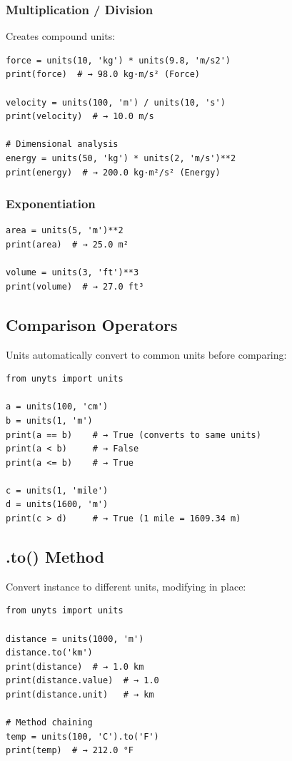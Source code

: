 \documentclass[11pt,a4paper]{report}
\begin{document}
\subsubsection{Multiplication / Division}

Creates compound units:

\begin{lstlisting}[style=pythonstyle]
force = units(10, 'kg') * units(9.8, 'm/s2')
print(force)  # → 98.0 kg·m/s² (Force)

velocity = units(100, 'm') / units(10, 's')
print(velocity)  # → 10.0 m/s

# Dimensional analysis
energy = units(50, 'kg') * units(2, 'm/s')**2
print(energy)  # → 200.0 kg·m²/s² (Energy)
\end{lstlisting}

\subsubsection{Exponentiation}

\begin{lstlisting}[style=pythonstyle]
area = units(5, 'm')**2
print(area)  # → 25.0 m²

volume = units(3, 'ft')**3
print(volume)  # → 27.0 ft³
\end{lstlisting}

\subsection{Comparison Operators}

Units automatically convert to common units before comparing:

\begin{lstlisting}[style=pythonstyle]
from unyts import units

a = units(100, 'cm')
b = units(1, 'm')
print(a == b)    # → True (converts to same units)
print(a < b)     # → False
print(a <= b)    # → True

c = units(1, 'mile')
d = units(1600, 'm')
print(c > d)     # → True (1 mile = 1609.34 m)
\end{lstlisting}

\subsection{.to() Method}

Convert instance to different units, modifying in place:

\begin{lstlisting}[style=pythonstyle]
from unyts import units

distance = units(1000, 'm')
distance.to('km')
print(distance)  # → 1.0 km
print(distance.value)  # → 1.0
print(distance.unit)   # → km

# Method chaining
temp = units(100, 'C').to('F')
print(temp)  # → 212.0 °F
\end{lstlisting}
\end{document}
